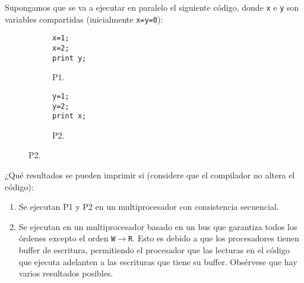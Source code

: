 \begin{ejercicio}
    Supongamos que se va a ejecutar en paralelo el siguiente código, donde \verb|x| e \verb|y| son variables compartidas (inicialmente \verb|x=y=0|):
    \begin{figure}[H]
        \centering
        \begin{subfigure}{0.3\textwidth}
            \begin{verbatim}
x=1;
x=2;
print y;
            \end{verbatim}
            \caption{P1.}
        \end{subfigure}\hspace{3cm}
        \begin{subfigure}{0.3\textwidth}
            \begin{verbatim}
y=1;
y=2;
print x;
            \end{verbatim}
            \caption{P2.}            
        \end{subfigure}
    \end{figure}

    ¿Qué resultados se pueden imprimir si (considere que el compilador no altera el código):
    \begin{enumerate}
        \item Se ejecutan P1 y P2 en un multiprocesador con consistencia secuencial.
        \item Se ejecutan en un multiprocesador basado en un bus que garantiza todos los órdenes excepto el orden \verb|W|$\to$\verb|R|. Esto es debido a que los procesadores tienen buffer de escritura, permitiendo el procesador que las lecturas en el código que ejecuta adelanten a las escrituras que tiene su buffer.  Obsérvese que hay varios resultados posibles.
    \end{enumerate}


\end{ejercicio}
